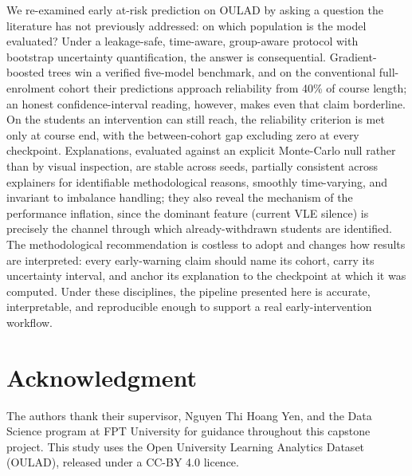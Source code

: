 \documentclass[conference]{IEEEtran}
\begin{document}
We re-examined early at-risk prediction on OULAD by asking a question the
literature has not previously addressed: on which population is the model
evaluated? Under a leakage-safe, time-aware, group-aware protocol with
bootstrap uncertainty quantification, the answer is consequential.
Gradient-boosted trees win a verified five-model benchmark, and on the
conventional full-enrolment cohort their predictions approach reliability
from 40\% of course length; an honest confidence-interval reading, however,
makes even that claim borderline. On the students an intervention can still
reach, the reliability criterion is met only at course end, with the
between-cohort gap excluding zero at every checkpoint. Explanations,
evaluated against an explicit Monte-Carlo null rather than by visual
inspection, are stable across seeds, partially consistent across explainers
for identifiable methodological reasons, smoothly time-varying, and
invariant to imbalance handling; they also reveal the mechanism of the
performance inflation, since the dominant feature (current VLE silence) is
precisely the channel through which already-withdrawn students are
identified. The methodological recommendation is costless to adopt and
changes how results are interpreted: every early-warning claim should name
its cohort, carry its uncertainty interval, and anchor its explanation to
the checkpoint at which it was computed. Under these disciplines, the
pipeline presented here is accurate, interpretable, and reproducible enough
to support a real early-intervention workflow.

\section*{Acknowledgment}
The authors thank their supervisor, Nguyen Thi Hoang Yen, and the Data
Science program at FPT University for guidance throughout this capstone
project. This study uses the Open University Learning Analytics Dataset
(OULAD), released under a CC-BY 4.0 licence.
\end{document}
